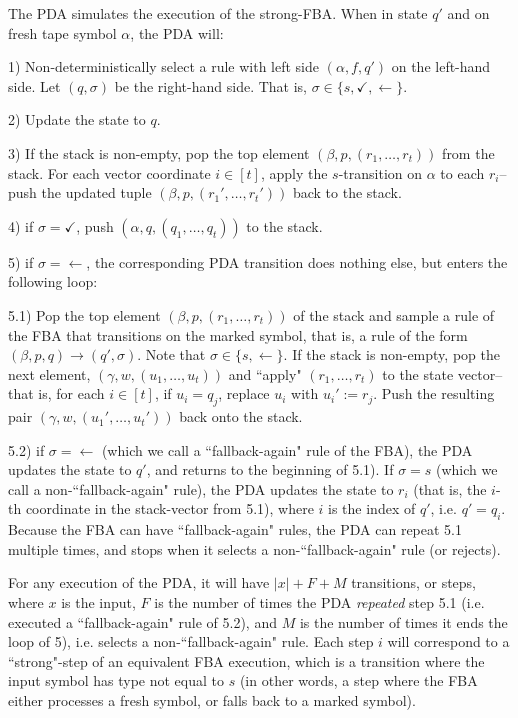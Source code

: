 \documentclass[11pt]{article}
\begin{document}
The PDA simulates the execution of the strong-FBA. When in state $q'$ and on fresh tape symbol $\alpha$, the PDA will:

1) Non-deterministically select a rule with left side $(\alpha,f,q')$ on the left-hand side. Let $(q,\sigma)$ be the right-hand side. That is, $\sigma \in \{s,\checkmark,\leftarrow\}$.


2) Update the state to $q$.


3) If the stack is non-empty, pop the top element $(\beta,p, (r_1,\ldots,r_t))$ from the stack. For each vector coordinate $i \in [t]$, apply the $s$-transition on $\alpha$ to each $r_i$-- push the updated tuple $(\beta,p, (r_1',\ldots,r_t'))$ back to the stack.


4) if $\sigma = \checkmark$, push $(\alpha, q, (q_1,\ldots,q_t))$ to the stack.


5) if $\sigma = \leftarrow$, the corresponding PDA transition does nothing else, but enters the following loop:

5.1) Pop the top element $(\beta, p, (r_1,\ldots,r_t))$ of the stack and sample a rule of the FBA that transitions on the marked symbol, that is, a rule of the form $(\beta,p,q)\rightarrow (q',\sigma)$. Note that $\sigma \in \{s,\leftarrow\}$. If the stack is non-empty, pop the next element, $(\gamma, w, (u_1,\ldots,u_t))$ and ``apply" $(r_1,\ldots,r_t)$ to the state vector-- that is, for each $i \in [t]$, if $u_i = q_j$, replace $u_i$ with $u_i' := r_j$. Push the resulting pair $(\gamma, w, (u_1',\ldots,u_t'))$ back onto the stack.

5.2) if $\sigma = \leftarrow$ (which we call a ``fallback-again" rule of the FBA), the PDA updates the state to $q'$, and returns to the beginning of 5.1). If $\sigma = s$ (which we call a non-``fallback-again" rule), the PDA updates the state to $r_i$ (that is, the $i$-th coordinate in the stack-vector from 5.1), where $i$ is the index of $q'$, i.e. $q'=q_i$. Because the FBA can have ``fallback-again" rules, the PDA can repeat 5.1 multiple times, and stops when it selects a non-``fallback-again" rule (or rejects).

For any execution of the PDA, it will have $|x|+F+M$ transitions, or steps, where $x$ is the input, $F$ is the number of times the PDA {\em repeated} step 5.1 (i.e. executed a ``fallback-again" rule of 5.2), and $M$ is the number of times it ends the loop of 5), i.e. selects a non-``fallback-again" rule. Each step $i$ will correspond to a ``strong"-step of an equivalent FBA execution, which is a transition where the input symbol has type not equal to $s$ (in other words, a step where the FBA either processes a fresh symbol, or falls back to a marked symbol).
\end{document}
